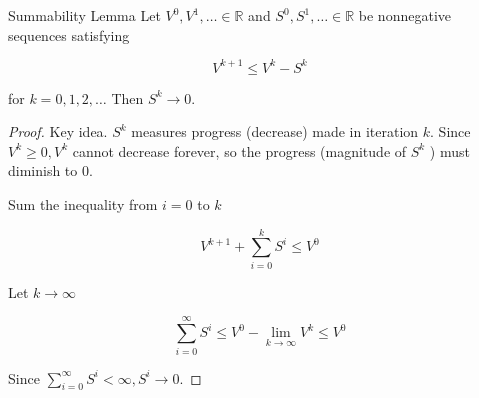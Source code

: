 \begin{frame}[allowframebreaks]

\begin{mytheoremblock}{2.5}{Summability Lemma}
    Let $V^{0}, V^{1}, \ldots \in \mathbb{R}$ and $S^{0}, S^{1}, \ldots \in \mathbb{R}$ be nonnegative sequences satisfying

    $$
    V^{k+1} \leq V^{k}-S^{k}
    $$

    for $k=0,1,2, \ldots$ Then $S^{k} \rightarrow 0$.

    \begin{proof}
        Key idea. $S^{k}$ measures progress (decrease) made in iteration $k$. Since $V^{k} \geq 0, V^{k}$ cannot decrease forever, so the progress (magnitude of $S^{k}$ ) must diminish to 0.

        Sum the inequality from $i=0$ to $k$

        $$
        V^{k+1}+\sum_{i=0}^{k} S^{i} \leq V^{0}
        $$

        Let $k \rightarrow \infty$

        $$
        \sum_{i=0}^{\infty} S^{i} \leq V^{0}-\lim _{k \rightarrow \infty} V^{k} \leq V^{0}
        $$

        Since $\sum_{i=0}^{\infty} S^{i}<\infty, S^{i} \rightarrow 0$.
    \end{proof}
\end{mytheoremblock}

\end{frame}

